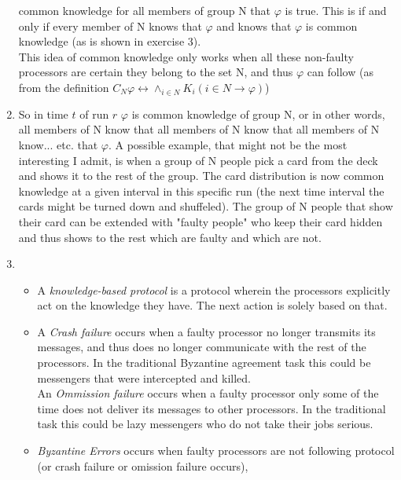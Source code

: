 \documentclass[12pt]{article} %
\begin{document}
\begin{enumerate}
        common knowledge for all members of group N that $\varphi$ is true.
        This is if and only if every member of N knows that $\varphi$ and knows
        that $\varphi$ is common knowledge (as is shown in exercise 3). \\ This
        idea of common knowledge only works when all these non-faulty processors are
        certain they belong to the set N, and thus $\varphi$ can follow (as from
        the definition $C_N \varphi \leftrightarrow \wedge_{i \in N} K_i(i \in N
        \to \varphi)$)
    \item So in time $t$ of run $r$ $\varphi$ is common knowledge of group N, or in
        other words, all members of N know that all members of N know that all
        members of N know... etc. that $\varphi$. A possible example, that might
        not be the most interesting I admit, is when a group of N people pick a
        card from the deck and shows it to the rest of the group. The card
        distribution is now common knowledge at a given interval in this
        specific run (the next time interval the cards might be turned down and
        shuffeled). The group of N people that show their card can be extended
        with "faulty people" who keep their card hidden and thus shows to the
        rest which are faulty and which are not.
    \item 
        \begin{itemize}
            \item A \emph{knowledge-based protocol} is a protocol wherein the
                processors explicitly act on the knowledge they have. The next
                action is solely based on that.
            \item A \emph{Crash failure} occurs when a faulty processor no
                longer transmits its messages, and thus does no longer
                communicate with the rest of the processors. In the traditional Byzantine
                agreement task this could be messengers that were intercepted
                and killed.\\
                An \emph{Ommission failure} occurs when a faulty processor only
                some of the time does not deliver its messages to other
                processors. In the traditional task this could be lazy
                messengers who do not take their jobs serious.
            \item \emph{Byzantine Errors} occurs when faulty processors are not
                following protocol (or crash failure or omission failure occurs),

\end{itemize}
\end{enumerate}
\end{document}
